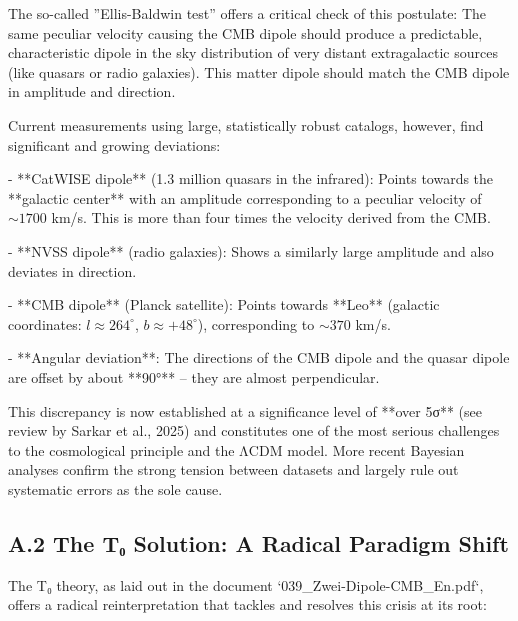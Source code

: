 \documentclass[12pt,a4paper]{article}
\begin{document}
	The so-called ''Ellis-Baldwin test'' offers a critical check of this postulate: The same peculiar velocity causing the CMB dipole should produce a predictable, characteristic dipole in the sky distribution of very distant extragalactic sources (like quasars or radio galaxies). This matter dipole should match the CMB dipole in amplitude and direction.
	
	Current measurements using large, statistically robust catalogs, however, find significant and growing deviations:
	
	- **CatWISE dipole** (1.3 million quasars in the infrared): Points towards the **galactic center** with an amplitude corresponding to a peculiar velocity of $\sim 1700$ km/s. This is more than four times the velocity derived from the CMB.
	
	- **NVSS dipole** (radio galaxies): Shows a similarly large amplitude and also deviates in direction.
	
	- **CMB dipole** (Planck satellite): Points towards **Leo** (galactic coordinates: $l \approx 264^\circ$, $b \approx +48^\circ$), corresponding to $\sim 370$ km/s.
	
	- **Angular deviation**: The directions of the CMB dipole and the quasar dipole are offset by about **90°** – they are almost perpendicular.
	
	This discrepancy is now established at a significance level of **over 5σ** (see review by Sarkar et al., 2025) and constitutes one of the most serious challenges to the cosmological principle and the ΛCDM model. More recent Bayesian analyses confirm the strong tension between datasets and largely rule out systematic errors as the sole cause.
	
	\subsection*{A.2 The T₀ Solution: A Radical Paradigm Shift}
	
	The T₀ theory, as laid out in the document `039\_Zwei-Dipole-CMB\_En.pdf`, offers a radical reinterpretation that tackles and resolves this crisis at its root:
	
\end{document}

